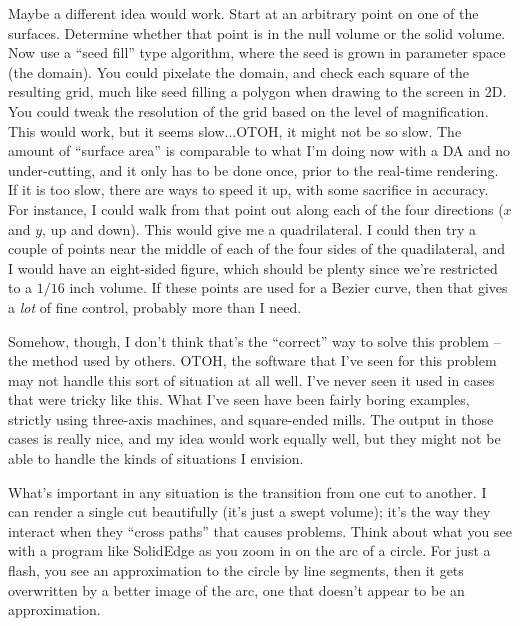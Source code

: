 \documentclass[titlepage,oneside,10pt]{article}
\begin{document}
Maybe a different idea would work. Start at an arbitrary point on one
of the surfaces. Determine whether that point is in the null volume or
the solid volume. Now use a ``seed fill'' type algorithm, where the
seed is grown in parameter space (the domain). You could pixelate the
domain, and check each square of the resulting grid, much like seed
filling a polygon when drawing to the screen in 2D. You could tweak
the resolution of the grid based on the level of magnification. This
would work, but it seems slow...OTOH, it might not be so slow. The
amount of ``surface area'' is comparable to what I'm doing now with a
DA and no under-cutting, and it only has to be done once, prior to the
real-time rendering. If it is too slow, there are ways to speed it up,
with some sacrifice in accuracy. For instance, I could walk from that
point out along each of the four directions ($x$ and $y$, up and
down). This would give me a quadrilateral. I could then try a couple
of points near the middle of each of the four sides of the
quadilateral, and I would have an eight-sided figure, which should be
plenty since we're restricted to a $1/16$ inch volume. If these points
are used for a Bezier curve, then that gives a \emph{lot} of fine
control, probably more than I need.

Somehow, though, I don't think that's the ``correct'' way to solve
this problem -- the method used by others. OTOH, the software that
I've seen for this problem may not handle this sort of situation at
all well. I've never seen it used in cases that were tricky like
this. What I've seen have been fairly boring examples, strictly using
three-axis machines, and square-ended mills. The output in those cases
is really nice, and my idea would work equally well, but they might
not be able to handle the kinds of situations I envision.

What's important in any situation is the transition from one cut to
another. I can render a single cut beautifully (it's just a swept
volume); it's the way they interact when they ``cross paths'' that
causes problems. Think about what you see with a program like
SolidEdge as you zoom in on the arc of a circle. For just a flash, you
see an approximation to the circle by line segments, then it gets
overwritten by a better image of the arc, one that doesn't appear to
be an approximation.
\end{document}
